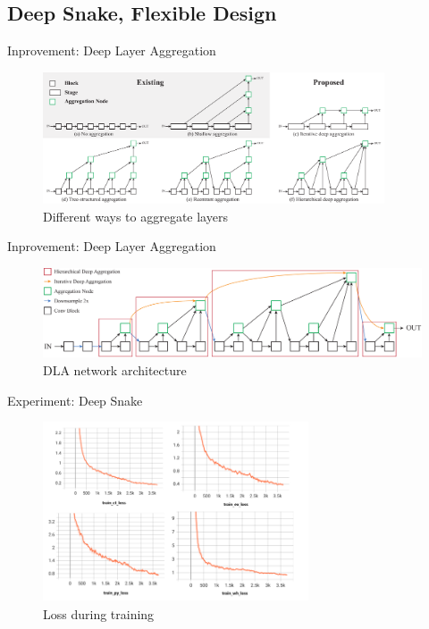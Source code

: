 \subsection{Deep Snake, Flexible Design}
\begin{frame}{Inprovement: Deep Layer Aggregation}
	\begin{figure}[h]
		\centering
		\includegraphics[width=0.9\textwidth]{images/diff_aggregation.pdf}
		\caption{Different ways to aggregate layers}
		\label{fig:diff_aggregation}
	\end{figure}
\end{frame}

\begin{frame}{Inprovement: Deep Layer Aggregation}
	\begin{figure}[h]
		\centering
		\includegraphics[width=\textwidth]{images/dla_architecture.pdf}
		\caption{DLA network architecture}
		\label{fig:dla_architecture}
	\end{figure}
\end{frame}

\begin{frame}{Experiment: Deep Snake}
	\begin{figure}[h]
		\centering
		\includegraphics[width=0.7\textwidth]{images/train_loss.png}
		\caption{Loss during training}
		\label{fig:train_loss}
	\end{figure}
\end{frame}

